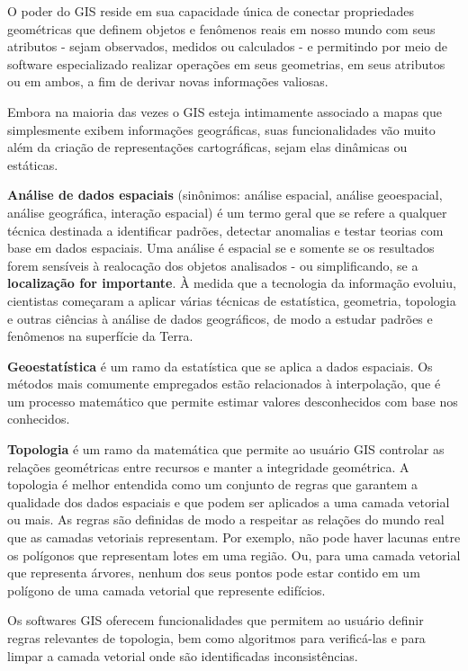 \documentclass[
  portuguese,
]{krantz}
\begin{document}
O poder do GIS reside em sua capacidade única de conectar propriedades geométricas que definem objetos e fenômenos reais em nosso mundo com seus atributos - sejam observados, medidos ou calculados - e permitindo por meio de software especializado realizar operações em seus geometrias, em seus atributos ou em ambos, a fim de derivar novas informações valiosas.

Embora na maioria das vezes o GIS esteja intimamente associado a mapas que simplesmente exibem informações geográficas, suas funcionalidades vão muito além da criação de representações cartográficas, sejam elas dinâmicas ou estáticas.

\textbf{Análise de dados espaciais} (sinônimos: análise espacial, análise geoespacial, análise geográfica, interação espacial) é um termo geral que se refere a qualquer técnica destinada a identificar padrões, detectar anomalias e testar teorias com base em dados espaciais. Uma análise é espacial se e somente se os resultados forem sensíveis à realocação dos objetos analisados \hspace{0pt}\hspace{0pt}- ou simplificando, se a \textbf{localização for importante}. À medida que a tecnologia da informação evoluiu, cientistas começaram a aplicar várias técnicas de estatística, geometria, topologia e outras ciências à análise de dados geográficos, de modo a estudar padrões e fenômenos na superfície da Terra.

\textbf{Geoestatística} é um ramo da estatística que se aplica a dados espaciais. Os métodos mais comumente empregados estão relacionados à interpolação, que é um processo matemático que permite estimar valores desconhecidos com base nos conhecidos.

\textbf{Topologia} é um ramo da matemática que permite ao usuário GIS controlar as relações geométricas entre recursos e manter a integridade geométrica. A topologia é melhor entendida como um conjunto de regras que garantem a qualidade dos dados espaciais e que podem ser aplicados a uma camada vetorial ou mais. As regras são definidas de modo a respeitar as relações do mundo real que as camadas vetoriais representam. Por exemplo, não pode haver lacunas entre os polígonos que representam lotes em uma região. Ou, para uma camada vetorial que representa árvores, nenhum dos seus pontos pode estar contido em um polígono de uma camada vetorial que represente edifícios.

Os softwares GIS oferecem funcionalidades que permitem ao usuário definir regras relevantes de topologia, bem como algoritmos para verificá-las e para limpar a camada vetorial onde são identificadas inconsistências.
\end{document}
